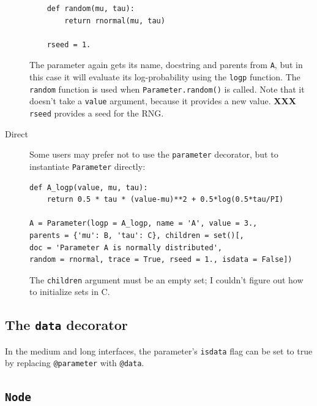 \documentclass[]{book}
\begin{document}
\begin{description}
\begin{verbatim}
    def random(mu, tau):
        return rnormal(mu, tau)

    rseed = 1.
    \end{verbatim}
The parameter again gets its name, docstring and parents from \texttt{A}, but in this case it will evaluate its log-probability using the \texttt{logp} function. The \texttt{random} function is used when \texttt{Parameter.random()} is called. Note that it doesn't take a \texttt{value} argument, because it provides a new value. \textbf{XXX} \texttt{rseed} provides a seed for the RNG.

    \item[Direct] Some users may prefer not to use the \texttt{parameter} decorator, but to instantiate \texttt{Parameter} directly:
\begin{verbatim}
def A_logp(value, mu, tau):
    return 0.5 * tau * (value-mu)**2 + 0.5*log(0.5*tau/PI)

A = Parameter(logp = A_logp, name = 'A', value = 3.,
parents = {'mu': B, 'tau': C}, children = set()[,
doc = 'Parameter A is normally distributed',
random = rnormal, trace = True, rseed = 1., isdata = False])
\end{verbatim}
The \texttt{children} argument must be an empty set; I couldn't figure out how to initialize sets in C.
\end{description}



\subsection{The \texttt{data} decorator}\label{sub:@data}
In the medium and long interfaces, the parameter's \texttt{isdata} flag can be set to true by replacing \texttt{@parameter} with \texttt{@data}.


\subsection{\texttt{Node}}\label{sub:node}
\end{document}
